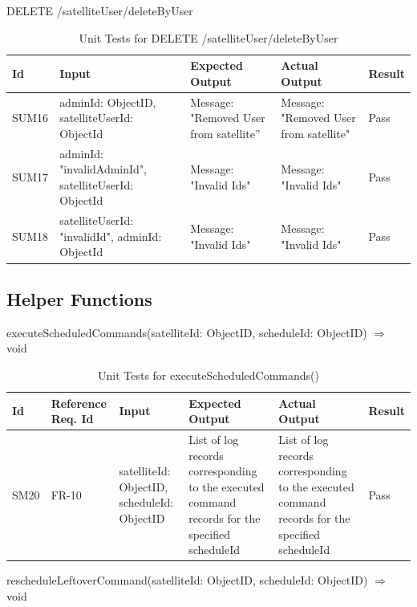 \documentclass[12pt, titlepage]{article}
\begin{document}
DELETE /satelliteUser/deleteByUser

\begin{center}
\begin{longtable}{|p{1.5cm} | p{3cm} |p{2cm}| p{2cm} |p{2cm}|}
\caption{Unit Tests for \newline DELETE /satelliteUser/deleteByUser}
\hline
\textbf{Id}  & \textbf{Input} & \textbf{Expected Output} & \textbf{Actual Output} & \textbf{Result} \\
\hline
SUM16 &  { adminId: ObjectID, satelliteUserId: ObjectId } & { Message: "Removed User from satellite”} & { Message: "Removed User from satellite"} & Pass
\\
\hline
SUM17 & { adminId: "invalidAdminId", satelliteUserId: ObjectId} & { Message: "Invalid Ids"} & { Message: "Invalid Ids" } & Pass
\\
\hline
SUM18 & { satelliteUserId: "invalidId", adminId: ObjectId} & { Message: "Invalid Ids"} & { Message: "Invalid Ids" } & Pass
\\
\hline

\end{longtable}

\end{center}

\subsection{Helper Functions}

executeScheduledCommands(satelliteId: ObjectID, scheduleId: ObjectID) $\Rightarrow$ void

\begin{center}
\begin{longtable}{|p{1cm} | p{2cm} |p{2cm}| p{2cm} |p{2cm}| p{2cm}|}
\caption{Unit Tests for executeScheduledCommands()}
\hline
\textbf{Id} & \textbf{Reference Req. Id} & \textbf{Input} & \textbf{Expected Output} & \textbf{Actual Output} & \textbf{Result} \\
\hline
SM20 & FR-10 & { satelliteId: ObjectID,
scheduleId: ObjectID } & List of log records corresponding to the executed command records for the specified scheduleId & List of log records corresponding to the executed command records for the specified scheduleId & Pass
\\
\hline

\end{longtable}

\end{center}

rescheduleLeftoverCommand(satelliteId: ObjectID, scheduleId: ObjectID) $\Rightarrow$ void
\end{document}
